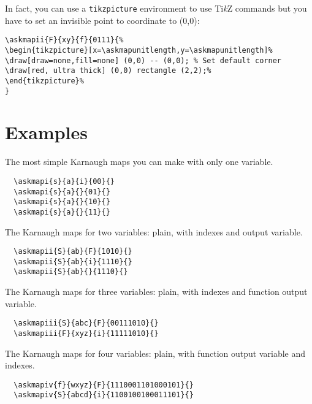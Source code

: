 \documentclass[a4paper,10pt]{ltxdoc}
\begin{document}
\bigskip
In fact, you can use a \texttt{tikzpicture} environment to use Ti\textsl{k}Z commands
but you have to set an invisible point to coordinate to (0,0):

\begin{verbatim}
\askmapii{F}{xy}{f}{0111}{%
\begin{tikzpicture}[x=\askmapunitlength,y=\askmapunitlength]%
\draw[draw=none,fill=none] (0,0) -- (0,0); % Set default corner
\draw[red, ultra thick] (0,0) rectangle (2,2);%
\end{tikzpicture}%
}
\end{verbatim}


\section{Examples}
\label{sec:examples}
\askmapunitlength=0.88cm
The most simple Karnaugh maps you can make with only one variable.
\begin{verbatim}
  \askmapi{s}{a}{i}{00}{}
  \askmapi{s}{a}{}{01}{}
  \askmapi{s}{a}{}{10}{}
  \askmapi{s}{a}{}{11}{}
\end{verbatim}
%
%
%
%
\bigskip\bigskip

The Karnaugh maps for two variables: plain, with indexes and output
variable.
\begin{verbatim}
  \askmapii{S}{ab}{F}{1010}{}
  \askmapii{S}{ab}{i}{1110}{}
  \askmapii{S}{ab}{}{1110}{}
\end{verbatim}
\bigskip\bigskip

The Karnaugh maps for three variables: plain, with indexes and function
output variable.
\begin{verbatim}
  \askmapiii{S}{abc}{F}{00111010}{}
  \askmapiii{F}{xyz}{i}{11111010}{}
\end{verbatim}
\bigskip\bigskip

The Karnaugh maps for four variables: plain, with function output variable and
indexes.
\begin{verbatim}
  \askmapiv{f}{wxyz}{F}{1110001101000101}{}
  \askmapiv{S}{abcd}{i}{1100100100011101}{}
\end{verbatim}
\bigskip\bigskip
\end{document}
